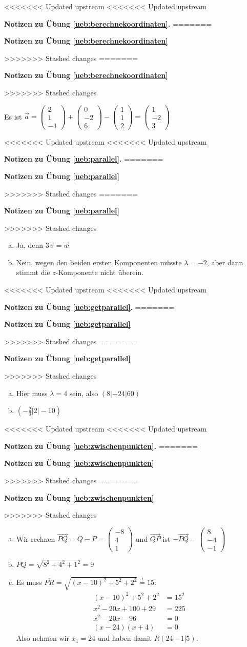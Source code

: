 \documentclass[%
11pt,%
twoside,%
titlepage,%
<<<<<<< Updated upstream
<<<<<<< Updated upstream
german,%
=======
swissgerman,%
>>>>>>> Stashed changes
=======
swissgerman,%
>>>>>>> Stashed changes
headsepline%
]{scrartcl}
\newcommand{\faReturnGray}{\textcolor{gray}{\faMailReply}} %
\newcommand{\faReturnGray}{\textcolor{gray}{\faMailReply}} %
\theoremstyle{definition}
\theoremstyle{plain}
\newcommand{\concatueb}[1]{ueb:#1}%
\newcommand{\concatlsg}[1]{lsg:#1}%
\newenvironment{lsg}[1]{%
<<<<<<< Updated upstream
<<<<<<< Updated upstream
    \par\noindent\textbf{Notizen zu Übung \ref{\concatueb{#1}}.}%
    \label{\concatlsg{#1}}
=======
    \par\noindent\textbf{Notizen zu Übung \ref{\concatueb{#1}}}\label{\concatlsg{#1}}
    \hfill\hyperref[\concatueb{#1}]{\faReturnGray}\par %
>>>>>>> Stashed changes
=======
    \par\noindent\textbf{Notizen zu Übung \ref{\concatueb{#1}}}\label{\concatlsg{#1}}
    \hfill\hyperref[\concatueb{#1}]{\faReturnGray}\par %
>>>>>>> Stashed changes
}{%
    \par%
}
\begin{document}
\begin{lsg}{berechnekoordinaten}
    Es ist $\vec{a}=\begin{pmatrix}
        2\\1\\-1
    \end{pmatrix}+\begin{pmatrix}
        0\\-2\\6
    \end{pmatrix}-\begin{pmatrix}
        1\\1\\2
    \end{pmatrix}=\begin{pmatrix}
        1\\-2\\3
    \end{pmatrix}$
\end{lsg}
\begin{lsg}{parallel}
    \begin{enumerate}[a)]
        \item Ja, denn $3\vec{v}=\vec{w}$
        \item Nein, wegen den beiden ersten Komponenten müsste $\lambda=-2$, aber dann stimmt die $z$-Komponente nicht überein.
    \end{enumerate}
\end{lsg}
\begin{lsg}{getparallel}
    \begin{enumerate}[a)]
        \item Hier muss $\lambda=4$ sein, also $(8|-24|60)$
        \item $(-\frac{2}{3}|2|-10)$
    \end{enumerate}
\end{lsg}
\begin{lsg}{zwischenpunkten}
    \begin{enumerate}[a)]
        \item Wir rechnen $\vec{PQ}=Q-P=\begin{pmatrix}
            -8\\4\\1
        \end{pmatrix}$ und $\vec{QP}$ ist $-\vec{PQ}=\begin{pmatrix}
            8\\-4\\-1
        \end{pmatrix}$
        \item $\overline{PQ}=\sqrt{8^2+4^2+1^2}=9$
        \item Es muss $\overline{PR}=\sqrt{(x-10)^2+5^2+2^2}\stackrel{!}{=}15$:
        \begin{align*}
            (x-10)^2+5^2+2^2 &= 15^2\\
            x^2-20x+100+29 &= 225\\
            x^2-20x-96 &= 0\\
            (x-24)(x+4) &= 0
        \end{align*}
        Also nehmen wir $x_1=24$ und haben damit $R(24|-1|5)$.
    \end{enumerate}
\end{lsg}
\end{document}
